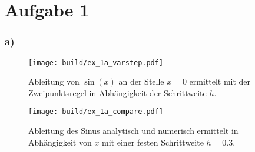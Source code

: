 \section*{Aufgabe 1}
\subsubsection*{a)}
\begin{figure}
    \centering
    \texttt{[image: build/ex\_1a\_varstep.pdf]}
    \caption{Ableitung von $\sin(x)$ an der Stelle $x=0$ ermittelt mit der Zweipunktsregel
    in Abhängigkeit der Schrittweite $h$.}
    \label{fig:h_dep}
\end{figure}

\begin{figure}
    \centering
    \texttt{[image: build/ex\_1a\_compare.pdf]}
    \caption{Ableitung des Sinus analytisch und numerisch ermittelt in Abhängigkeit von 
    $x$ mit einer festen Schrittweite $h=0.3$.}
    \label{fig:a_comp}
\end{figure}

